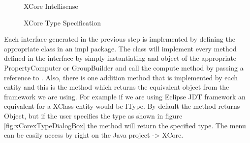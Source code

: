 \begin{figure}
\centering
{}
\label{fig:xCoreCommentView}
\caption{XCore Intellisense}
\end{figure}

\begin{figure}[h]
\centering
{}
\label{fig:xCorexRunExample}
\caption{XCore Type Specification}
\end{figure}
	
	Each interface generated in the previous step is implemented by defining the
appropriate class in an impl package. The class will implement every method
defined in the interface by simply instantiating and object of the appropriate
PropertyComputer or GroupBuilder and call the compute method by passing a
reference to . Also, there is one addition method that is implemented 
by each entity and this is the  method which returns
the equivalent object from the framework we are using. For example if we are
using Eclipse JDT framework an equivalent for a XClass entity would be IType.
By default the method returns Object, but if the user specifies the type as
shown in figure \ref{fig:xCorexTypeDialogBox} the method will return the
specified type. The menu can be easily access by right on the
{J}ava project -> XCore.

